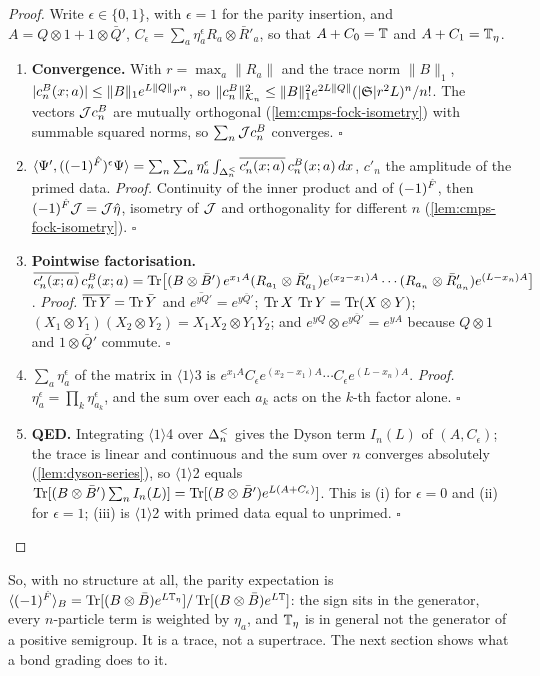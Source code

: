 \begin{proof}
Write $\epsilon\in\{0,1\}$, with $\epsilon=1$ for the parity insertion, and
$A=Q\otimes1+1\otimes\bar Q'$, $C_\epsilon=\sum_a\eta_a^\epsilon R_a\otimes\bar R'_a$, so that
$A+C_0=\mathbb T$ and $A+C_1=\mathbb T_\eta$.
\begin{enumerate}
\item[$\langle1\rangle$1.] \textbf{Convergence.} With $r=\max_a\|R_a\|$ and the trace norm
$\|B\|_1$, $|c^{B}_n(x;a)|\le\|B\|_1e^{L\|Q\|}r^n$, so
$\|c^{B}_n\|^2_{\mathcal K_{n}}\le\|B\|_1^2e^{2L\|Q\|}(|\mathfrak S|r^2L)^n/n!$. The vectors
$\mathcal Jc^{B}_n$ are mutually orthogonal (\cref{lem:cmps-fock-isometry}) with summable squared
norms, so $\sum_n\mathcal Jc^{B}_n$ converges. $\square$
\item[$\langle1\rangle$2.] $\langle\Psi',((-1)^{\hat F})^\epsilon\Psi\rangle=\sum_n\sum_a\eta_a^\epsilon
\int_{\Delta^{<}_{n}}\overline{c'_n(x;a)}\,c^{B}_n(x;a)\,dx$, $c'_n$ the amplitude of the primed
data. \emph{Proof.} Continuity of the inner product and of $(-1)^{\hat F}$, then
$(-1)^{\hat F}\mathcal J=\mathcal J\hat\eta$, isometry of $\mathcal J$ and orthogonality for different $n$
(\cref{lem:cmps-fock-isometry}). $\square$
\item[$\langle1\rangle$3.] \textbf{Pointwise factorisation.}
$\overline{c'_n(x;a)}\,c^{B}_n(x;a)=\operatorname{Tr}\bigl[(B\otimes\bar B')\,e^{x_1A}(R_{a_1}\otimes\bar
R'_{a_1})e^{(x_2-x_1)A}\cdots(R_{a_n}\otimes\bar R'_{a_n})e^{(L-x_n)A}\bigr]$. \emph{Proof.}
$\overline{\operatorname{Tr} Y}=\operatorname{Tr}\bar Y$ and $\overline{e^{yQ'}}=e^{y\bar Q'}$; $\operatorname{Tr} X\,\operatorname{Tr} Y=\operatorname{Tr}(X\otimes Y)$;
$(X_1\otimes Y_1)(X_2\otimes Y_2)=X_1X_2\otimes Y_1Y_2$; and $e^{yQ}\otimes e^{y\bar
Q'}=e^{yA}$ because $Q\otimes1$ and $1\otimes\bar Q'$ commute. $\square$
\item[$\langle1\rangle$4.] $\sum_a\eta_a^\epsilon$ of the matrix in $\langle1\rangle$3 is
$e^{x_1A}C_\epsilon e^{(x_2-x_1)A}\cdots C_\epsilon e^{(L-x_n)A}$. \emph{Proof.}
$\eta_a^\epsilon=\prod_k\eta_{a_k}^\epsilon$, and the sum over each $a_k$ acts on the $k$-th
factor alone. $\square$
\item[$\langle1\rangle$5.] \textbf{QED.} Integrating $\langle1\rangle$4 over $\Delta^{<}_{n}$ gives the
Dyson term $I_n(L)$ of $(A,C_\epsilon)$; the trace is linear and continuous and the sum over
$n$ converges absolutely (\cref{lem:dyson-series}), so $\langle1\rangle$2 equals
$\operatorname{Tr}[(B\otimes\bar B')\sum_nI_n(L)]=\operatorname{Tr}[(B\otimes\bar B')e^{L(A+C_\epsilon)}]$. This is (i) for
$\epsilon=0$ and (ii) for $\epsilon=1$; (iii) is $\langle1\rangle$2 with primed data equal to
unprimed. $\square$
\end{enumerate}
\end{proof}

So, with no structure at all, the parity expectation is
$\langle(-1)^{\hat F}\rangle_B=\operatorname{Tr}[(B\otimes\bar B)e^{L\mathbb T_\eta}]/\operatorname{Tr}[(B\otimes\bar B)e^{L\mathbb T}]$:
the sign sits in the generator, every $n$-particle term is weighted by $\eta_a$, and
$\mathbb T_\eta$ is in general not the generator of a positive semigroup. It is a trace, not a
supertrace. The next section shows what a bond grading does to it.
